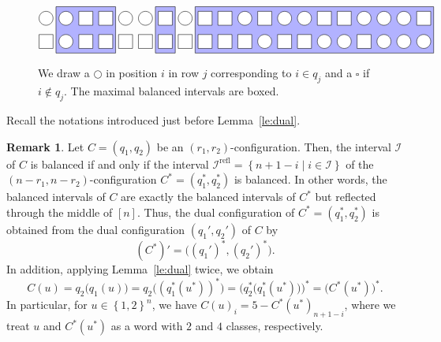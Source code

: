 \documentclass[reqno]{amsart}
\newcommand{\0}{\phantom{c}}
\newcommand{\mcI}{\mathcal{I}}
\newenvironment{verlong}{}{}
\newcommand{\set}[1]{\left\{ #1 \right\}}
\newcommand{\tup}[1]{\left( #1 \right)}
\newcommand{\ive}[1]{\left[ #1 \right]}
\theoremstyle{plain}
\theoremstyle{definition}
\newtheorem{remark}[thm]{Remark}
\numberwithin{equation}{section}
\begin{document}
\begin{verlong}
\begin{figure}[t]
\[
\begin{tikzpicture}[scale=0.75]
  \def\sc{0.85}   %
  \def\ll{2}   %
  \def\l{1}   %
  \draw[fill=blue!30] (1.5*\sc,\l-.5) rectangle(4.5*\sc,\ll+.5);
  \draw[fill=blue!30] (6.5*\sc,\l-.5) rectangle(7.5*\sc,\ll+.5);
  \draw[fill=blue!30] (8.5*\sc,\l-.5) rectangle(20.5*\sc,\ll+.5);
  \foreach \i in {1,2,5,6,8,11,13,14,17,18,19} { \draw[fill=white] (\i*\sc,\ll) circle (0.3); }
  \foreach \i in {3,4,7,9,10,12,15,16,20} { \draw[fill=white] (\i*\sc-.3,\ll-.3) rectangle +(0.6,+0.6); }
  \foreach \i in {2,12,15,16,18,19,20} { \draw[fill=white] (\i*\sc,\l) circle (0.3); }
  \foreach \i in {1,3,4,5,6,7,8,9,10,11,13,14,17} { \draw[fill=white] (\i*\sc-.3,\l-.3) rectangle +(0.6,+0.6); }
\end{tikzpicture}
\]
\caption{We draw a $\bigcirc$ in position $i$ in row $j$ corresponding to $i \in q_j$ and a $\square$ if $i \notin q_j$.
The maximal balanced intervals are boxed.}
\label{fig:balanced-old6}
\end{figure}

Recall the notations introduced just before Lemma~\ref{le:dual}.

\begin{remark}
\label{rmk:balanced-dual-let-old6}
Let $C = (q_1, q_2)$ be an $(r_1, r_2)$-configuration.
Then, the interval $\mcI$ of $C$ is balanced if and only if the interval $\mcI^{\operatorname{refl}} = \set{ n + 1 - i \mid i \in \mcI }$ of the $(n-r_1, n-r_2)$-configuration $C^* = (q_1^*, q_2^*)$ is balanced.
In other words, the balanced intervals of $C$ are exactly the balanced intervals of $C^*$ but reflected through the middle of $\ive{n}$.
Thus, the dual configuration of $C^* = \tup{q_1^*, q_2^*}$ is obtained from the dual configuration $\tup{q_1', q_2'}$ of $C$ by
\begin{equation}
 (C^*)' = \bigl( (q_1')^*, (q_2')^* \bigr) .
 \label{eq.rmk:balanced-dual-let.dual-old6}
\end{equation}
In addition, applying Lemma~\ref{le:dual} twice, we obtain
\[
C(u) = q_2\bigl( q_1(u) \bigr) = q_2\bigl( (q^*_1(u^*))^* \bigr) = \bigl( q_2^*\bigl( q_1^*(u^*) \bigr) \bigr)^* = \bigl( C^*(u^*) \bigr)^* .
\]
In particular, for $u \in \set{1,2}^n$, we have $C(u)_i = 5 - C^*(u^*)_{n+1-i}$, where we treat $u$ and $C^*(u^*)$ as a word with $2$ and $4$ classes, respectively.
\end{remark}


\end{verlong}
\end{document}
